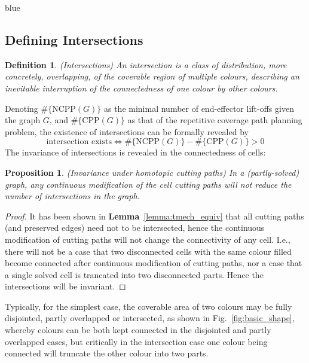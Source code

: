 \documentclass[journal]{IEEEtran}
\newtheorem{definition}[theorem]{Definition}
\newtheorem{proposition}[theorem]{Proposition}
\begin{document}
\begin{color}{blue}
\subsection{Defining Intersections}
\begin{definition}
(Intersections) An intersection is a class of distribution, more concretely, overlapping, of the coverable region of multiple colours, describing an inevitable interruption of the connectedness of one colour 
by other colours. 
\end{definition}
Denoting $\#\{\mbox{NCPP}(G)\}$ as the minimal number of end-effector lift-offs given the graph $G$, and $\#\{\mbox{CPP}(G)\}$ as that of the repetitive coverage path planning problem, the existence of intersections can be formally revealed by
\begin{equation}
\mbox{intersection exists}\Leftrightarrow \#\{\mbox{NCPP}(G)\} - \#\{\mbox{CPP}(G)\} > 0
\end{equation} 
The invariance of intersections is revealed in the connectedness of cells: 

\begin{proposition}\label{lemma:invariance}
(Invariance under homotopic cutting paths) In a (partly-solved) graph, any continuous modification of the cell cutting paths will not reduce the number of intersections in the graph. 
\end{proposition}
\begin{proof}
It has been shown in \textbf{Lemma}~\ref{lemma:tmech_equiv} that all cutting paths (and preserved edges) need not to be intersected, hence the continuous modification of cutting paths will not change the connectivity of any cell. I.e., there will not be a case that two disconnected cells with the same colour filled become connected after continuous modification of cutting paths, nor a case that a single solved cell is trancated into two disconnected parts. Hence the intersections will be invariant. 
\end{proof}

Typically, for the simplest case, the coverable area of two colours may be fully disjointed, partly overlapped or intersected, as shown in Fig.~\ref{fig:basic_shape}, 
whereby colours can be both kept connected in the disjointed and partly overlapped cases, but critically in the intersection case one colour being connected will truncate the other colour into two parts.


\end{color}
\end{document}
